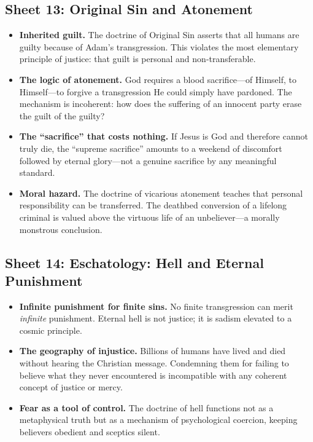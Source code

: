 \subsection{Sheet 13: Original Sin and Atonement}

\begin{itemize}
  \item \textbf{Inherited guilt.}
    The doctrine of Original Sin asserts that all humans
    are guilty because of Adam's transgression.  This violates the most
    elementary principle of justice: that guilt is personal and
    non-transferable.
  \item \textbf{The logic of atonement.}
    God requires a blood sacrifice---of Himself, to
    Himself---to forgive a transgression He could simply have pardoned.
    The mechanism is incoherent: how does the suffering of an innocent party
    erase the guilt of the guilty?
  \item \textbf{The ``sacrifice'' that costs nothing.}
    If Jesus is God and therefore cannot truly die, the ``supreme sacrifice''
    amounts to a weekend of discomfort followed by eternal glory---not a
    genuine sacrifice by any meaningful standard.
  \item \textbf{Moral hazard.}
    The doctrine of vicarious atonement teaches that personal responsibility
    can be transferred.  The deathbed conversion
    of a lifelong criminal is valued above the virtuous life of an
    unbeliever---a morally monstrous conclusion.
\end{itemize}

\subsection{Sheet 14: Eschatology: Hell and Eternal Punishment}

\begin{itemize}
  \item \textbf{Infinite punishment for finite sins.}
    No finite transgression can merit \emph{infinite} punishment.
    Eternal hell is not justice; it is sadism elevated to a cosmic principle.
  \item \textbf{The geography of injustice.}
    Billions of humans have lived and died without hearing the Christian
    message.  Condemning them for failing to believe what they never
    encountered is incompatible with any coherent concept of justice or
    mercy.
  \item \textbf{Fear as a tool of control.}
    The doctrine of hell functions not as a metaphysical truth but as a
    mechanism of psychological coercion, keeping believers obedient and
    sceptics silent.
\end{itemize}

